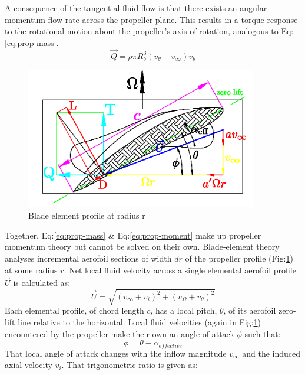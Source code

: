 A consequence of the tangential fluid flow is that there exists an angular momentum flow rate across the propeller plane. This results in a torque response to the rotational motion about the propeller's axis of rotation, analogous to Eq:\ref{eq:prop-mass}.
\\
\vspace{-10pt}
\begin{equation}\label{eq:prop-moment}
\vec{Q}=\rho\pi R_b^3 (v_\theta-v_\infty) v_b 
\end{equation}
\begin{figure}[hbtp]
\vspace{-15pt}
\centering
\includegraphics[width=0.9\textwidth]{figs/bem-profile}
\caption{Blade element profile at radius r}
\label{fig:bem-profile}
\end{figure}
\par
Together, Eq:\ref{eq:prop-mass} \& Eq:\ref{eq:prop-moment} make up propeller momentum theory but cannot be solved on their own. Blade-element theory analyses incremental aerofoil sections of width $dr$ of the propeller profile (Fig:\ref{fig:bem-profile}) at some radius $r$. Net local fluid velocity across a single elemental aerofoil profile $\vec{U}$ is calculated as:
\begin{equation}
\vec{U}=\sqrt{(v_\infty+v_i)^2+(v_\Omega+v_\theta)^2}
\end{equation}
Each elemental profile, of chord length $c$, has a local pitch, $\theta$, of its aerofoil zero-lift line relative to the horizontal. Local fluid velocities (again in Fig:\ref{fig:bem-profile}) encountered by the propeller make their own an angle of attack $\phi$ such that:
\begin{equation}
\phi=\theta-\alpha_{effective}
\end{equation}
That local angle of attack changes with the inflow magnitude $v_\infty$ and the induced axial velocity $v_i$. That trigonometric ratio is given as:
